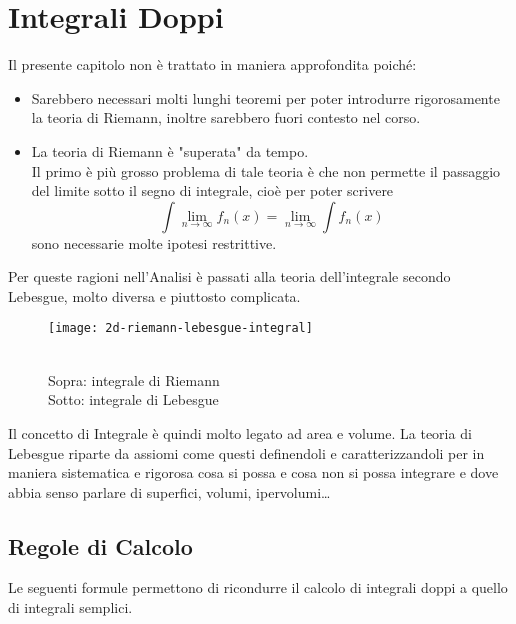 \chapter{Integrali Doppi}\label{chap:int_doppi}
Il presente capitolo non è trattato in maniera approfondita poiché:
\begin{itemize}
	\item Sarebbero necessari molti lunghi teoremi per poter introdurre rigorosamente la teoria di Riemann, inoltre sarebbero fuori contesto nel corso.
	\item La teoria di Riemann è "superata" da tempo.\\
		Il primo è più grosso problema di tale teoria è che non permette il passaggio del limite sotto il segno di integrale, cioè per poter scrivere 
		\[ \int\lim\limits_{n\to\infty}f_n(x) = \lim\limits_{n\to\infty}\int f_n(x)\]
		sono necessarie molte ipotesi restrittive.
\end{itemize}
Per queste ragioni nell'Analisi è passati alla teoria dell'integrale secondo Lebesgue, molto diversa e piuttosto complicata.
\begin{figure}[H]
	\centering
	\texttt{[image: 2d-riemann-lebesgue-integral]}
	\caption{\\Sopra: integrale di Riemann\\Sotto: integrale di Lebesgue}
\end{figure}

Il concetto di Integrale è quindi molto legato ad area e volume. La teoria di Lebesgue riparte da assiomi come questi definendoli e caratterizzandoli per in maniera sistematica e rigorosa cosa si possa e cosa non si possa integrare e dove abbia senso parlare di superfici, volumi, ipervolumi\dots

\newpage
\section{Regole di Calcolo}
Le seguenti formule permettono di ricondurre il calcolo di integrali doppi a quello di integrali semplici.

